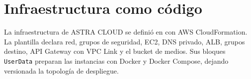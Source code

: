 \chapter{Infraestructura como código}
La infraestructura de ASTRA CLOUD se definió en  con AWS CloudFormation. La plantilla declara red, grupos de seguridad, EC2, DNS privado, ALB, grupos destino, API Gateway con VPC Link y el bucket de medios. Sus bloques \texttt{UserData} preparan las instancias con Docker y Docker Compose, dejando versionada la topología de despliegue.
